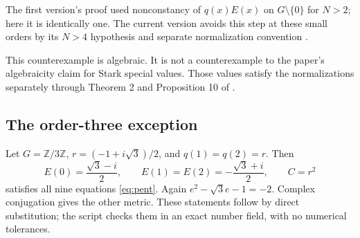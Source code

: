 \documentclass[11pt]{article}
\theoremstyle{remark}
\newcommand{\Z}{\mathbb Z}
\begin{document}
The first version's proof used nonconstancy of $q(x)E(x)$ on
$G\setminus\{0\}$ for $N>2$; here it is identically one.
The current version avoids this step at these small orders by its $N>4$
hypothesis and separate normalization convention \cite[Theorem~5 and Remark~3]{RW2}.

This counterexample is algebraic. It is not a counterexample to the paper's
algebraicity claim for Stark special values. Those values satisfy the
normalizations separately through Theorem 2 and Proposition 10 of \cite{RW}.

\subsection{The order-three exception}
Let $G=\Z/3\Z$, $r=(-1+i\sqrt3)/2$, and $q(1)=q(2)=r$. Then
\begin{equation}\label{eq:exception3}
 E(0)=\frac{\sqrt3-i}{2},\qquad
 E(1)=E(2)=-\frac{\sqrt3+i}{2},\qquad C=r^2
\end{equation}
satisfies all nine equations \eqref{eq:pent}. Again
$e^2-\sqrt3e-1=-2$. Complex conjugation gives the other metric.
These statements follow by direct substitution; the script checks them in an
exact number field, with no numerical tolerances.
\end{document}

